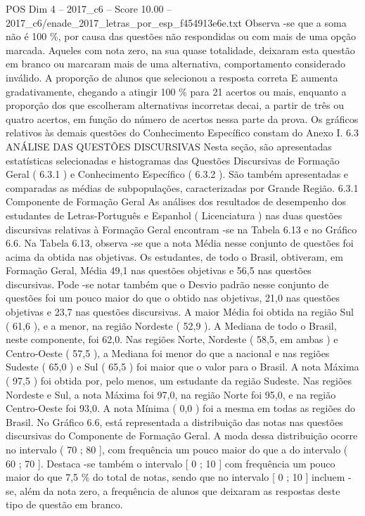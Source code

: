 \begin{textsample}{POS Dim 4 – 2017\_c6 – Score 10.00 – 2017\_c6/enade\_2017\_letras\_por\_esp\_f454913e6e.txt}
Observa -se que a soma não é 100 \%, por causa das questões não respondidas ou com mais de uma opção marcada.
Aqueles com nota zero, na sua quase totalidade, deixaram esta questão em branco ou marcaram mais de uma alternativa, comportamento considerado inválido.
A proporção de alunos que selecionou a resposta correta E aumenta gradativamente, chegando a atingir 100 \% para 21 acertos ou mais, enquanto a proporção dos que escolheram alternativas incorretas decai, a partir de três ou quatro acertos, em função do número de acertos nessa parte da prova.
Os gráficos relativos às demais questões do Conhecimento Específico constam do Anexo I. 6.3 ANÁLISE DAS QUESTÕES DISCURSIVAS Nesta seção, são apresentadas estatísticas selecionadas e histogramas das Questões Discursivas de Formação Geral ( 6.3.1 ) e Conhecimento Específico ( 6.3.2 ).
São também apresentadas e comparadas as médias de subpopulações, caracterizadas por Grande Região. 6.3.1 Componente de Formação Geral As análises dos resultados de desempenho dos estudantes de Letras-Português e Espanhol ( Licenciatura ) nas duas questões discursivas relativas à Formação Geral encontram -se na Tabela 6.13 e no Gráfico 6.6.
Na Tabela 6.13, observa -se que a nota Média nesse conjunto de questões foi acima da obtida nas objetivas.
Os estudantes, de todo o Brasil, obtiveram, em Formação Geral, Média 49,1 nas questões objetivas e 56,5 nas questões discursivas.
Pode -se notar também que o Desvio padrão nesse conjunto de questões foi um pouco maior do que o obtido nas objetivas, 21,0 nas questões objetivas e 23,7 nas questões discursivas.
A maior Média foi obtida na região Sul ( 61,6 ), e a menor, na região Nordeste ( 52,9 ).
A Mediana de todo o Brasil, neste componente, foi 62,0.
Nas regiões Norte, Nordeste ( 58,5, em ambas ) e Centro-Oeste ( 57,5 ), a Mediana foi menor do que a nacional e nas regiões Sudeste ( 65,0 ) e Sul ( 65,5 ) foi maior que o valor para o Brasil.
A nota Máxima ( 97,5 ) foi obtida por, pelo menos, um estudante da região Sudeste.
Nas regiões Nordeste e Sul, a nota Máxima foi 97,0, na região Norte foi 95,0, e na região Centro-Oeste foi 93,0.
A nota Mínima ( 0,0 ) foi a mesma em todas as regiões do Brasil.
No Gráfico 6.6, está representada a distribuição das notas nas questões discursivas do Componente de Formação Geral.
A moda dessa distribuição ocorre no intervalo ( 70 ; 80 ], com frequência um pouco maior do que a do intervalo ( 60 ; 70 ].
Destaca -se também o intervalo [ 0 ; 10 ] com frequência um pouco maior do que 7,5 \% do total de notas, sendo que no intervalo [ 0 ; 10 ] incluem -se, além da nota zero, a frequência de alunos que deixaram as respostas deste tipo de questão em branco.

\end{textsample}
